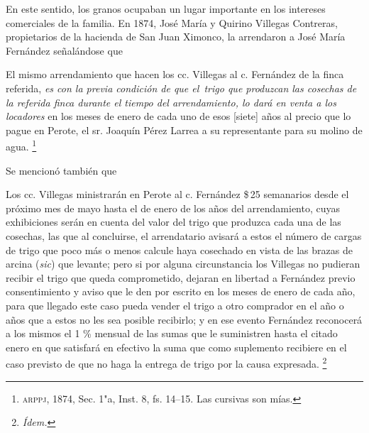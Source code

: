 \documentclass[14pt,twoside,final]{extbook} %
\let\oldfootnote\footnote
\renewcommand\footnote[1]{%
\oldfootnote{\hspace{1mm}#1}}
\begin{document}
En este sentido, los granos ocupaban un lugar importante en los intereses comerciales de la familia. En 1874, José María y Quirino Villegas Contreras, propietarios de la hacienda de San Juan Ximonco, la arrendaron a José María Fernández señalándose que
\begin{quoting}
El mismo arrendamiento que hacen los cc. Villegas al c. Fernández de la finca referida, \emph{es con la previa condición de que el~trigo que produzcan las cosechas de la referida finca durante el tiempo del arrendamiento, lo dará en venta a los locadores} en los meses de enero de cada uno de esos [siete] años al precio que lo pague en Perote, el sr. Joaquín Pérez Larrea a su representante para su molino de agua.\footnote{\textsc{arppj}, 1874, Sec. 1"a, Inst. 8, fs. 14--15. Las cursivas son mías.} 
\end{quoting}
Se mencionó también que
\begin{quoting}
Los cc. Villegas ministrarán en Perote al c. Fernández \$\,25 semanarios desde el próximo mes de mayo hasta el de enero de los años del arrendamiento, cuyas exhibiciones serán en cuenta del valor del trigo que produzca cada una de las cosechas, las que al concluirse, el arrendatario avisará a estos el número de cargas de trigo que poco más o menos calcule haya cosechado en vista de las brazas de arcina (\emph{sic}) que levante; pero si por alguna circunstancia los Villegas no pudieran recibir el trigo que queda comprometido, dejaran en libertad a Fernández previo consentimiento y aviso que le den por escrito en los meses de enero de cada año, para que llegado este caso pueda vender el trigo a otro comprador en el año o años que a estos no les sea posible recibirlo; y en ese evento Fernández reconocerá a los mismos el 1 \% mensual de las sumas que le suministren hasta el citado enero en que satisfará en efectivo la suma que como suplemento recibiere en el caso previsto de que no haga la entrega de trigo por la causa expresada.\footnote{\em Ídem.}
\end{quoting}
\end{document}

